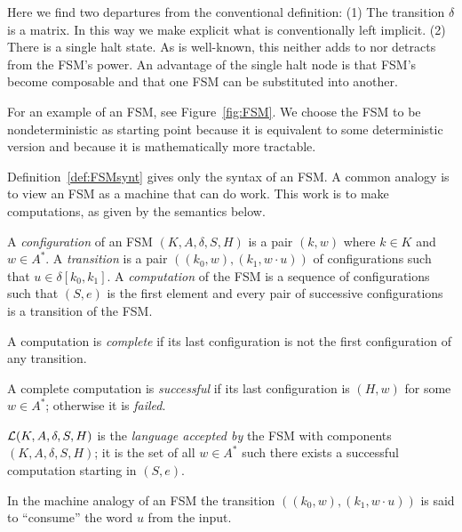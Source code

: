 \documentclass[preprint,11pt]{elsarticle}
\begin{document}
Here we find two departures from the conventional definition:
(1) The transition $\delta$ is a matrix.
In this way we make explicit what is conventionally
left implicit.
(2) There is a single halt state. As is well-known,
this neither adds to nor detracts from the FSM's power.
An advantage of the single halt node is that FSM's
become composable and that one FSM can be substituted into another.

For an example of an FSM, see Figure~\ref{fig:FSM}.
We choose the FSM to be nondeterministic as starting point
because it is equivalent to some deterministic version
and because it is mathematically more tractable.

Definition~\ref{def:FSMsynt} gives only the syntax of
an FSM.
A common analogy is to view an FSM as a machine
that can do work.
This work is to make computations, as given by the semantics
below.

\begin{definition}
\label{def:FSMbeh}
A \emph{configuration} of an FSM $(K,A,\delta,S,H)$
is a pair $(k,w)$ where $k \in K$
and $w \in A^*$.
A \emph{transition} is a pair
$((k_0,w),(k_1,w\cdot u))$ of configurations
such that $u \in \delta[k_0,k_1]$.
A \emph{computation} of the FSM is a sequence of configurations
such that $(S,e)$ is the first element
and every pair of successive configurations
is a transition of the FSM.

A computation is \emph{complete} if its last configuration
is not the first configuration of any transition.

A complete computation is \emph{successful} if its last
configuration is $(H,w)$ for some $w \in A^*$;
otherwise it is \emph{failed}.

$\mathcal{L}(K,A,\delta,S,H)$
is the \emph{language accepted by}
the FSM with components $(K,A,\delta,S,H)$;
it is the set of all $w \in A^*$
such there exists a successful
computation
starting in $(S,e)$.
\end{definition}
In the machine analogy of an FSM the transition
$((k_0,w),(k_1,w\cdot u))$ is said to ``consume''
the word $u$ from the input.
\end{document}
